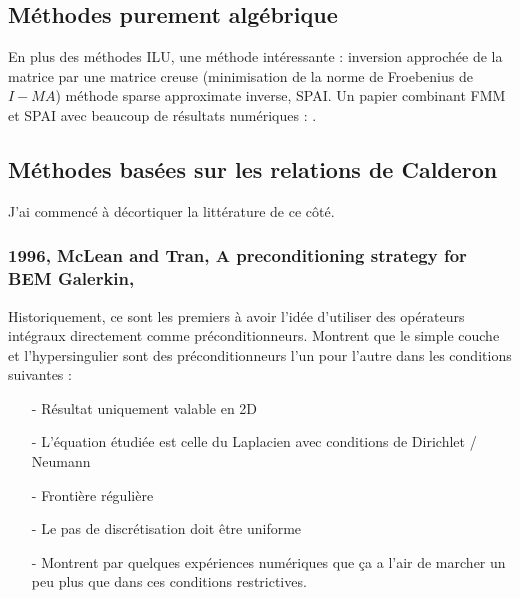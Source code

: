 \documentclass[11pt,a4paper]{article}
\begin{document}
\subsection{Méthodes purement algébrique}

En plus des méthodes ILU, une méthode intéressante : inversion approchée de la matrice par une matrice creuse (minimisation de la norme de Froebenius de $I-MA$) méthode sparse approximate inverse, SPAI. Un papier combinant FMM et SPAI avec beaucoup de résultats numériques :  \cite{carpentieri2005combining}. 

\subsection{Méthodes basées sur les relations de Calderon}

J'ai commencé à décortiquer la littérature de ce côté. 

\subsubsection{1996, McLean and Tran, A preconditioning strategy for BEM Galerkin, \cite{mclean1997preconditioning}}

Historiquement, ce sont les premiers à avoir l'idée d'utiliser des opérateurs intégraux directement comme préconditionneurs. 
Montrent que le simple couche et l'hypersingulier sont des préconditionneurs l'un pour l'autre dans les conditions suivantes : 
\begin{itemize}
\item[-] Résultat uniquement valable en 2D
\item[-] L'équation étudiée est celle du Laplacien avec conditions de Dirichlet / Neumann
\item[-] Frontière régulière 
\item[-] Le pas de discrétisation doit être uniforme
\item[-] Montrent par quelques expériences numériques que ça a l'air de marcher un peu plus que dans ces conditions restrictives. 
\end{itemize}
\end{document}
